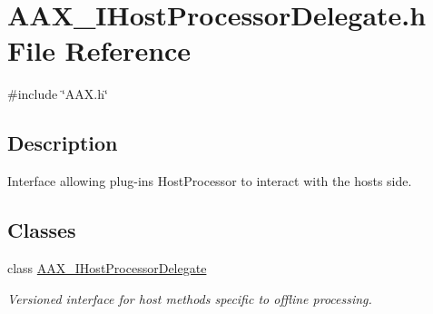 \hypertarget{a00608}{}\section{A\+A\+X\+\_\+\+I\+Host\+Processor\+Delegate.\+h File Reference}
\label{a00608}
{\ttfamily \#include \char`\"{}A\+A\+X.\+h\char`\"{}}\newline


\subsection{Description}
Interface allowing plug-\/in\textquotesingle{}s Host\+Processor to interact with the host\textquotesingle{}s side. 

\subsection*{Classes}
\begin{DoxyCompactItemize}
\item 
class \mbox{\hyperlink{a01837}{A\+A\+X\+\_\+\+I\+Host\+Processor\+Delegate}}
\begin{DoxyCompactList}\small\item\em Versioned interface for host methods specific to offline processing. \end{DoxyCompactList}\end{DoxyCompactItemize}
